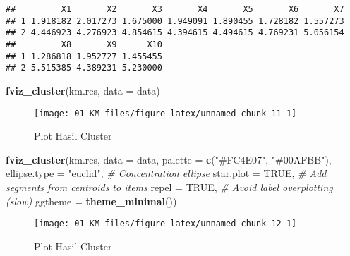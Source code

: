 \documentclass[
]{elegantbook}
\newenvironment{Shaded}{\begin{snugshade}}{\end{snugshade}}
\newcommand{\AttributeTok}[1]{\textcolor[rgb]{0.13,0.29,0.53}{#1}}
\newcommand{\CommentTok}[1]{\textcolor[rgb]{0.56,0.35,0.01}{\textit{#1}}}
\newcommand{\ConstantTok}[1]{\textcolor[rgb]{0.56,0.35,0.01}{#1}}
\newcommand{\FunctionTok}[1]{\textcolor[rgb]{0.13,0.29,0.53}{\textbf{#1}}}
\newcommand{\NormalTok}[1]{#1}
\newcommand{\StringTok}[1]{\textcolor[rgb]{0.31,0.60,0.02}{#1}}
\begin{document}
\begin{verbatim}
##         X1       X2       X3       X4       X5       X6       X7
## 1 1.918182 2.017273 1.675000 1.949091 1.890455 1.728182 1.557273
## 2 4.446923 4.276923 4.854615 4.394615 4.494615 4.769231 5.056154
##         X8       X9      X10
## 1 1.286818 1.952727 1.455455
## 2 5.515385 4.389231 5.230000
\end{verbatim}

\begin{Shaded}
\begin{Highlighting}[]
\FunctionTok{fviz\_cluster}\NormalTok{(km.res, }\AttributeTok{data =}\NormalTok{ data)}
\end{Highlighting}
\end{Shaded}

\begin{figure}

{\centering \texttt{[image: 01-KM\_files/figure-latex/unnamed-chunk-11-1]} 

}

\caption{Plot Hasil Cluster}\label{fig:unnamed-chunk-11}
\end{figure}

\begin{Shaded}
\begin{Highlighting}[]
\FunctionTok{fviz\_cluster}\NormalTok{(km.res, }\AttributeTok{data =}\NormalTok{ data,}
             \AttributeTok{palette =} \FunctionTok{c}\NormalTok{(}\StringTok{"\#FC4E07"}\NormalTok{, }\StringTok{"\#00AFBB"}\NormalTok{),}
             \AttributeTok{ellipse.type =} \StringTok{"euclid"}\NormalTok{, }\CommentTok{\# Concentration ellipse}
             \AttributeTok{star.plot =} \ConstantTok{TRUE}\NormalTok{, }\CommentTok{\# Add segments from centroids to items}
             \AttributeTok{repel =} \ConstantTok{TRUE}\NormalTok{, }\CommentTok{\# Avoid label overplotting (slow)}
             \AttributeTok{ggtheme =} \FunctionTok{theme\_minimal}\NormalTok{())}
\end{Highlighting}
\end{Shaded}

\begin{figure}

{\centering \texttt{[image: 01-KM\_files/figure-latex/unnamed-chunk-12-1]} 

}

\caption{Plot Hasil Cluster}\label{fig:unnamed-chunk-12}
\end{figure}
\end{document}
